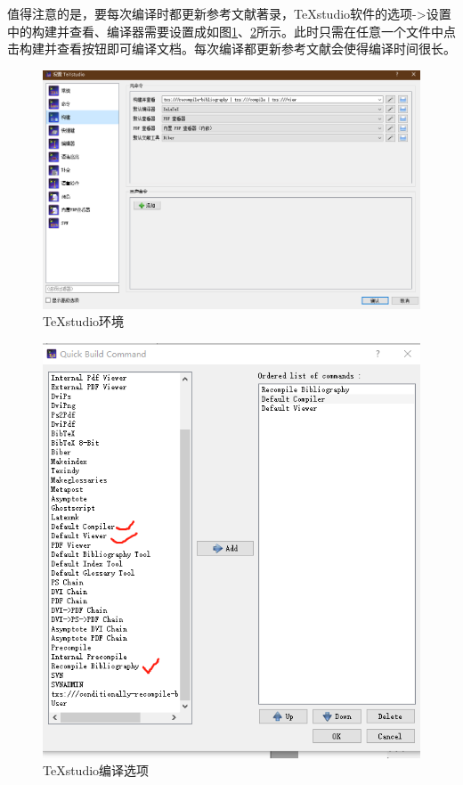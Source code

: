 值得注意的是，要每次编译时都更新参考文献著录，TeXstudio软件的选项->设置中的构建并查看、编译器需要设置成如图\ref{TeXstudio}、\ref{setup}所示。此时只需在任意一个文件中点击构建并查看按钮即可编译文档。每次编译都更新参考文献会使得编译时间很长。
\begin{figure}[htbp]
	\centering
	\includegraphics[scale=0.55]{Fig/TeXstudio.png}
	\caption{\label{TeXstudio}TeXstudio环境}
\end{figure}
\begin{figure}[htbp]
	\centering
	\includegraphics[scale=0.55]{Fig/setup.png}
	\caption{\label{setup}TeXstudio编译选项}
\end{figure}

